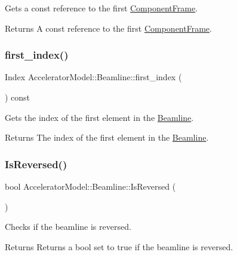 Gets a const reference to the first \hyperlink{classComponentFrame}{Component\+Frame}. \begin{DoxyReturn}{Returns}
A const reference to the first \hyperlink{classComponentFrame}{Component\+Frame}. 
\end{DoxyReturn}
\mbox{\label{classAcceleratorModel_1_1Beamline_a67b5d69c05315b04b3f0fb4c28fe40a9}} 
\subsubsection{\texorpdfstring{first\+\_\+index()}{first\_index()}}
{\footnotesize\ttfamily Index Accelerator\+Model\+::\+Beamline\+::first\+\_\+index (\begin{DoxyParamCaption}{ }\end{DoxyParamCaption}) const\hspace{0.3cm}{\ttfamily [inline]}}

Gets the index of the first element in the \hyperlink{classAcceleratorModel_1_1Beamline}{Beamline}. \begin{DoxyReturn}{Returns}
The index of the first element in the \hyperlink{classAcceleratorModel_1_1Beamline}{Beamline}. 
\end{DoxyReturn}
\mbox{\label{classAcceleratorModel_1_1Beamline_acbb49274dda0a8bbc7daa0a3a845508e}} 
\subsubsection{\texorpdfstring{Is\+Reversed()}{IsReversed()}}
{\footnotesize\ttfamily bool Accelerator\+Model\+::\+Beamline\+::\+Is\+Reversed (\begin{DoxyParamCaption}{ }\end{DoxyParamCaption})\hspace{0.3cm}{\ttfamily [inline]}}

Checks if the beamline is reversed. \begin{DoxyReturn}{Returns}
Returns a bool set to true if the beamline is reversed. 
\end{DoxyReturn}
\mbox{\label{classAcceleratorModel_1_1Beamline_aebb83c56d1f6b346f08f29cad78a4896}} 
